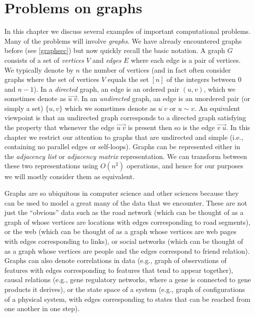 \section{Problems on graphs}\label{Problems-on-graphs}

In this chapter we discuss several examples of important computational
problems. Many of the problems will involve \emph{graphs}. We have
already encountered graphs before (see \cref{graphsec}) but now quickly
recall the basic notation. A graph \(G\) consists of a set of
\emph{vertices} \(V\) and \emph{edges} \(E\) where each edge is a pair
of vertices. We typically denote by \(n\) the number of vertices (and in
fact often consider graphs where the set of vertices \(V\) equals the
set \([n]\) of the integers between \(0\) and \(n-1\)). In a
\emph{directed} graph, an edge is an ordered pair \((u,v)\), which we
sometimes denote as \(\overrightarrow{u\;v}\). In an \emph{undirected}
graph, an edge is an unordered pair (or simply a set) \(\{ u,v \}\)
which we sometimes denote as \(\overline{u\; v}\) or \(u \sim v\). An
equivalent viewpoint is that an undirected graph corresponds to a
directed graph satisfying the property that whenever the edge
\(\overrightarrow{u\; v}\) is present then so is the edge
\(\overrightarrow{v\; u}\). In this chapter we restrict our attention to
graphs that are undirected and simple (i.e., containing no parallel
edges or self-loops). Graphs can be represented either in the
\emph{adjacency list} or \emph{adjacency matrix} representation. We can
transform between these two representations using \(O(n^2)\) operations,
and hence for our purposes we will mostly consider them as equivalent.

Graphs are so ubiquitous in computer science and other sciences because
they can be used to model a great many of the data that we encounter.
These are not just the ``obvious'' data such as the road network (which
can be thought of as a graph of whose vertices are locations with edges
corresponding to road segments), or the web (which can be thought of as
a graph whose vertices are web pages with edges corresponding to links),
or social networks (which can be thought of as a graph whose vertices
are people and the edges correspond to friend relation). Graphs can also
denote correlations in data (e.g., graph of observations of features
with edges corresponding to features that tend to appear together),
causal relations (e.g., gene regulatory networks, where a gene is
connected to gene products it derives), or the state space of a system
(e.g., graph of configurations of a physical system, with edges
corresponding to states that can be reached from one another in one
step).


